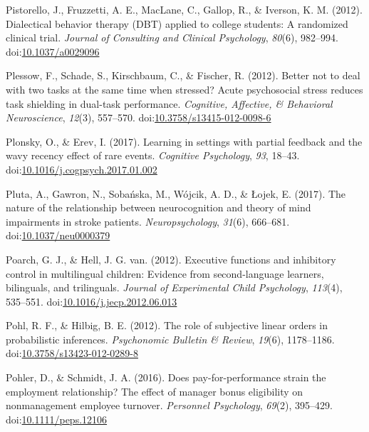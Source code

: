 \documentclass[english,man]{apa6}
\theoremstyle{definition}
\theoremstyle{definition}
\theoremstyle{definition}
\theoremstyle{remark}
\begin{document}
\hypertarget{ref-Pistorello2012}{}
Pistorello, J., Fruzzetti, A. E., MacLane, C., Gallop, R., \& Iverson,
K. M. (2012). Dialectical behavior therapy (DBT) applied to college
students: A randomized clinical trial. \emph{Journal of Consulting and
Clinical Psychology}, \emph{80}(6), 982--994.
doi:\href{https://doi.org/10.1037/a0029096}{10.1037/a0029096}

\hypertarget{ref-Plessow2012}{}
Plessow, F., Schade, S., Kirschbaum, C., \& Fischer, R. (2012). Better
not to deal with two tasks at the same time when stressed? Acute
psychosocial stress reduces task shielding in dual-task performance.
\emph{Cognitive, Affective, \& Behavioral Neuroscience}, \emph{12}(3),
557--570.
doi:\href{https://doi.org/10.3758/s13415-012-0098-6}{10.3758/s13415-012-0098-6}

\hypertarget{ref-Plonsky2017}{}
Plonsky, O., \& Erev, I. (2017). Learning in settings with partial
feedback and the wavy recency effect of rare events. \emph{Cognitive
Psychology}, \emph{93}, 18--43.
doi:\href{https://doi.org/10.1016/j.cogpsych.2017.01.002}{10.1016/j.cogpsych.2017.01.002}

\hypertarget{ref-Pluta2017}{}
Pluta, A., Gawron, N., Sobańska, M., Wójcik, A. D., \& Łojek, E. (2017).
The nature of the relationship between neurocognition and theory of mind
impairments in stroke patients. \emph{Neuropsychology}, \emph{31}(6),
666--681.
doi:\href{https://doi.org/10.1037/neu0000379}{10.1037/neu0000379}

\hypertarget{ref-Poarch2012}{}
Poarch, G. J., \& Hell, J. G. van. (2012). Executive functions and
inhibitory control in multilingual children: Evidence from
second-language learners, bilinguals, and trilinguals. \emph{Journal of
Experimental Child Psychology}, \emph{113}(4), 535--551.
doi:\href{https://doi.org/10.1016/j.jecp.2012.06.013}{10.1016/j.jecp.2012.06.013}

\hypertarget{ref-Pohl2012}{}
Pohl, R. F., \& Hilbig, B. E. (2012). The role of subjective linear
orders in probabilistic inferences. \emph{Psychonomic Bulletin \&
Review}, \emph{19}(6), 1178--1186.
doi:\href{https://doi.org/10.3758/s13423-012-0289-8}{10.3758/s13423-012-0289-8}

\hypertarget{ref-Pohler2016}{}
Pohler, D., \& Schmidt, J. A. (2016). Does pay-for-performance strain
the employment relationship? The effect of manager bonus eligibility on
nonmanagement employee turnover. \emph{Personnel Psychology},
\emph{69}(2), 395--429.
doi:\href{https://doi.org/10.1111/peps.12106}{10.1111/peps.12106}
\end{document}
